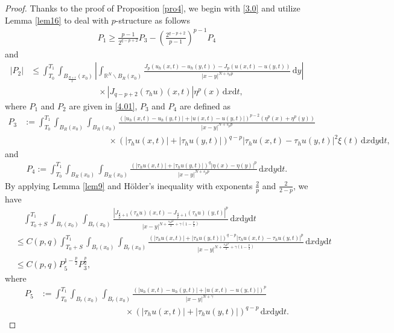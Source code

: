 \documentclass[reqno,10pt]{amsart}
\numberwithin{equation}{section}
\begin{document}
\begin{proof}
	Thanks to the proof of Proposition \ref{pro4}, we begin with \eqref{3.0} and utilize Lemma \ref{lem16} to deal with $p$-structure as follows
	\begin{align}
		\label{15.1}
		P_1\ge \frac{p-1}{2^{q-p+2}}P_3-\left( \frac{2^{q-p+2}}{p-1}\right)^{p-1}P_4 
	\end{align}
	and
	\begin{align*}
		|P_2|&\le \int_{T_0}^{T_1}\int_{B_\frac{R+r}{2}(x_0)}\left|\int_{\mathbb{R}^N\backslash B_R(x_0)}\frac{J_{p}(u_h(x,t)-u_h(y,t))-J_p(u(x,t)-u(y,t))}{|x-y|^{N+s_pp}}\,\mathrm{d}y\right|\\
		&\qquad\qquad\qquad\qquad\times\left|J_{q-p+2}(\tau_hu)(x,t)\right|\eta^p(x)\,\mathrm{d}x\mathrm{d}t, 
	\end{align*}
	where $P_1$ and $P_2$ are given in \eqref{4.01}, $P_3$ and $P_4$ are defined as
	\begin{align*}
		P_3&:=\int_{T_0}^{T_1}\int_{B_R(x_0)}\int_{B_R(x_0)}\frac{\left( |u_h(x,t)-u_h(y,t)|+|u(x,t)-u(y,t)|\right)^{p-2}\left( \eta^p(x)+\eta^p(y)\right)}{|x-y|^{N+s_pp}}\\
		&\qquad\qquad\qquad\qquad\qquad\times\left( |\tau_hu(x,t)|+|\tau_hu(y,t)|\right)^{q-p}|\tau_hu(x,t)-\tau_hu(y,t)|^2\xi(t)\,\mathrm{d}x\mathrm{d}y\mathrm{d}t,
	\end{align*}
	and
	\begin{align*}
		P_4:=\int_{T_0}^{T_1}\int_{B_R(x_0)}\int_{B_R(x_0)}\frac{\left( |\tau_hu(x,t)|+|\tau_hu(y,t)|\right)^{q}|\eta(x)-\eta(y)|^p}{|x-y|^{N+s_pp}}\,\mathrm{d}x\mathrm{d}y\mathrm{d}t.
	\end{align*}
	By applying Lemma \ref{lem9} and H\"{o}lder's inequality with exponents $ \frac{2}{p}$ and $\frac{2}{2-p} $, we have
	\begin{align}
		\label{15.2}
		&\quad\int_{T_0+S}^{T_1}\int_{B_r(x_0)}\int_{B_r(x_0)}\frac{\left|J_{\frac{q}{p}+1}(\tau_hu)(x,t)-J_{\frac{q}{p}+1}(\tau_hu)(y,t)\right|^p}{|x-y|^{N+\frac{s_pp^2}{2}+\gamma\left(1-\frac{p}{2}\right)}}\,\mathrm{d}x\mathrm{d}y\mathrm{d}t\nonumber\\
		&\le C(p,q)\int_{T_0+S}^{T_1}\int_{B_r(x_0)}\int_{B_r(x_0)}\frac{\left( |\tau_hu(x,t)|+|\tau_hu(y,t)|\right)^{q-p}|\tau_hu(x,t)-\tau_hu(y,t)|^p}{|x-y|^{N+\frac{s_pp^2}{2}+\gamma\left(1-\frac{p}{2}\right)}}\,\mathrm{d}x\mathrm{d}y\mathrm{d}t\nonumber\\
		&\le C(p,q)P_5^{1-\frac{p}{2}}P_3^{\frac{p}{2}},
	\end{align}
	where
	\begin{align*}
		P_5&:=\int_{T_0}^{T_1}\int_{B_r(x_0)}\int_{B_r(x_0)}\frac{\left( |u_h(x,t)-u_h(y,t)|+|u(x,t)-u(y,t)|\right)^p}{|x-y|^{N+\gamma}}\\
		&\qquad\qquad\qquad\qquad\qquad\times\left( |\tau_hu(x,t)|+|\tau_hu(y,t)|\right)^{q-p}\,\mathrm{d}x\mathrm{d}y\mathrm{d}t.
	\end{align*}
	

\end{proof}
\end{document}
